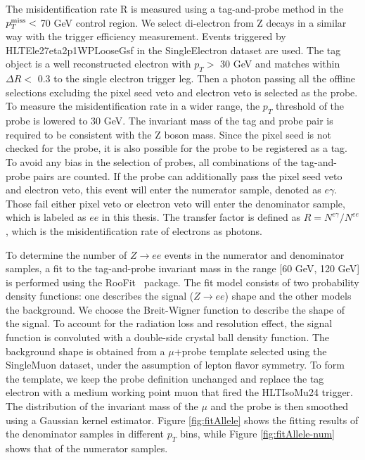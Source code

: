 \documentclass[thesis.tex]{subfiles}
\renewcommand\_{\textunderscore\allowbreak}
\begin{document}
The misidentification rate R is measured using a tag-and-probe method in the $p_T^\textrm{miss} < $ 70 GeV control region. We select di-electron from Z decays in a similar way with the trigger efficiency measurement. Events triggered by HLT\_Ele27\_eta2p1\_WPLoose\_Gsf in the SingleElectron dataset are used. The tag object is a well reconstructed electron with $p_T >$ 30 GeV and matches within $\Delta R <$ 0.3 to the single electron trigger leg. Then a photon passing all the offline selections excluding the pixel seed veto and electron veto is selected as the probe. To measure the misidentification rate in a wider range, the $p_T$ threshold of the probe is lowered to 30 GeV. The invariant mass of the tag and probe pair is required to be consistent with the Z boson mass. Since the pixel seed is not checked for the probe, it is also possible for the probe to be registered as a tag. To avoid any bias in the selection of probes, all combinations of the tag-and-probe pairs are counted. If the probe can additionally pass the pixel seed veto and electron veto, this event will enter the numerator sample, denoted as $e\gamma$. Those fail either pixel veto or electron veto will enter the denominator sample, which is labeled as $ee$ in this thesis. The transfer factor is defined as $R = N^{e\gamma}/N^{ee}$, which is the misidentification rate of electrons as photons.

To determine the number of $Z\rightarrow ee$ events in the numerator and denominator samples, a fit to the tag-and-probe invariant mass in the range [60 GeV, 120 GeV] is performed using the RooFit~\cite{RooFit} package. The fit model consists of two probability density functions: one describes the signal ($Z\rightarrow ee$) shape and the other models the background. We choose the Breit-Wigner function to describe the shape of the signal. To account for the radiation loss and resolution effect, the signal function is convoluted with a double-side crystal ball density function. The background shape is obtained from a $\mu$+probe template selected using the SingleMuon dataset, under the assumption of lepton flavor symmetry.  To form the template, we keep the probe definition unchanged and replace the tag electron with a medium working point muon that fired the HLT\_IsoMu24 trigger. The distribution of the invariant mass of the $\mu$ and the probe is then smoothed using a Gaussian kernel estimator. Figure \ref{fig:fitAllele} shows the fitting results of the denominator samples in different $p_T$ bins, while Figure \ref{fig:fitAllele-num} shows that of the numerator samples. 
\end{document}
